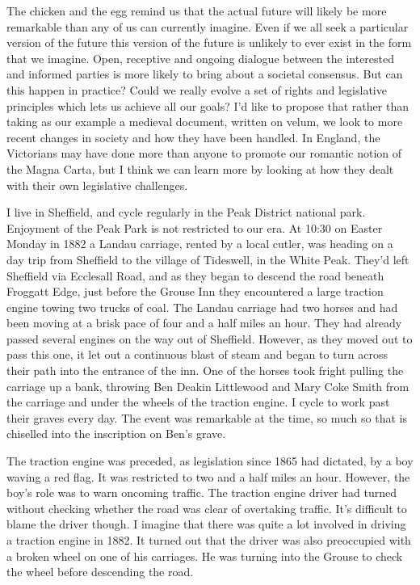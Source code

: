 \documentclass[a4paper]{caesar_book}
\begin{document}
The chicken and the egg remind us that the actual future will likely be more remarkable than any of us can currently imagine. Even if we all seek a particular version of the future this version of the future is unlikely to ever exist in the form that we imagine. Open, receptive and ongoing dialogue between the interested and informed parties is more likely to bring about a societal consensus. But can this happen in practice? Could we really evolve a set of rights and legislative principles which lets us achieve all our goals? I’d like to propose that rather than taking as our example a medieval document, written on velum, we look to more recent changes in society and how they have been handled. In England, the Victorians may have done more than anyone to promote our romantic notion of the Magna Carta, but I think we can learn more by looking at how they dealt with their own legislative challenges.

I live in Sheffield, and cycle regularly in the Peak District national park. Enjoyment of the Peak Park is not restricted to our era. At 10:30 on Easter Monday in 1882 a Landau carriage, rented by a local cutler, was heading on a day trip from Sheffield to the village of Tideswell, in the White Peak. They’d left Sheffield via Ecclesall Road, and as they began to descend the road beneath Froggatt Edge, just before the Grouse Inn they encountered a large traction engine towing two trucks of coal. The Landau carriage had two horses and had been moving at a brisk pace of four and a half miles an hour. They had already passed several engines on the way out of Sheffield. However, as they moved out to pass this one, it let out a continuous blast of steam and began to turn across their path into the entrance of the inn. One of the horses took fright pulling the carriage up a bank, throwing Ben Deakin Littlewood and Mary Coke Smith from the carriage and under the wheels of the traction engine. I cycle to work past their graves every day. The event was remarkable at the time, so much so that is chiselled into the inscription on Ben’s grave.

The traction engine was preceded, as legislation since 1865 had dictated, by a boy waving a red flag. It was restricted to two and a half miles an hour. However, the boy’s role was to warn oncoming traffic. The traction engine driver had turned without checking whether the road was clear of overtaking traffic. It’s difficult to blame the driver though. I imagine that there was quite a lot involved in driving a traction engine in 1882. It turned out that the driver was also preoccupied with a broken wheel on one of his carriages. He was turning into the Grouse to check the wheel before descending the road.
\end{document}
